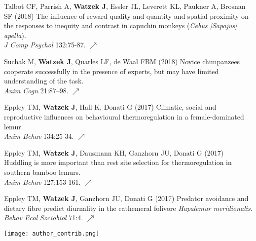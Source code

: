\documentclass[]{friggeri-cv}
\begin{document}
\begin{enumerate}[label={[\,\arabic*\,]}]
  \item {Talbot CF, Parrish A, \textbf{Watzek J}, Essler JL, Leverett KL, Paukner A, Brosnan SF (2018) The influence of reward quality and quantity and spatial proximity on the responses to inequity and contrast in capuchin monkeys (\emph{Cebus [Sapajus] apella}). \\\emph{J Comp Psychol} 132:75-87. \href{https://doi.org/10.1037/com0000088}{\small $\nearrow$}}
  \item {Suchak M, \textbf{Watzek J}, Quarles LF, de Waal FBM (2018) Novice chimpanzees cooperate successfully in the presence of experts, but may have limited understanding of the task. \\\emph{Anim Cogn} 21:87–98. \href{https://doi.org/10.1007/s10071-017-1142-2}{\small $\nearrow$}}
  \item {Eppley TM, \textbf{Watzek J}, Hall K, Donati G (2017) Climatic, social and reproductive influences on behavioural thermoregulation in a female-dominated lemur. \\\emph{Anim Behav} 134:25-34. \href{https://doi.org/10.1016/j.anbehav.2017.10.003}{\small $\nearrow$}}
  \item {Eppley TM, \textbf{Watzek J}, Dausmann KH, Ganzhorn JU, Donati G (2017) Huddling is more important than rest site selection for thermoregulation in southern bamboo lemurs. \\\emph{Anim Behav} 127:153-161. \href{https://doi.org/10.1016/j.anbehav.2017.03.019}{\small $\nearrow$}}
  \item {Eppley TM, \textbf{Watzek J}, Ganzhorn JU, Donati G (2017) Predator avoidance and dietary fibre predict diurnality in the cathemeral folivore \emph{Hapalemur meridionalis}. \\\emph{Behav Ecol Sociobiol} 71:4. \href{https://doi.org/10.1007/s00265-016-2247-3}{\small $\nearrow$}} 
\end{enumerate}

\texttt{[image: author\_contrib.png]}\\[.7cm] %


\pagestyle{fancy}
\end{document}
